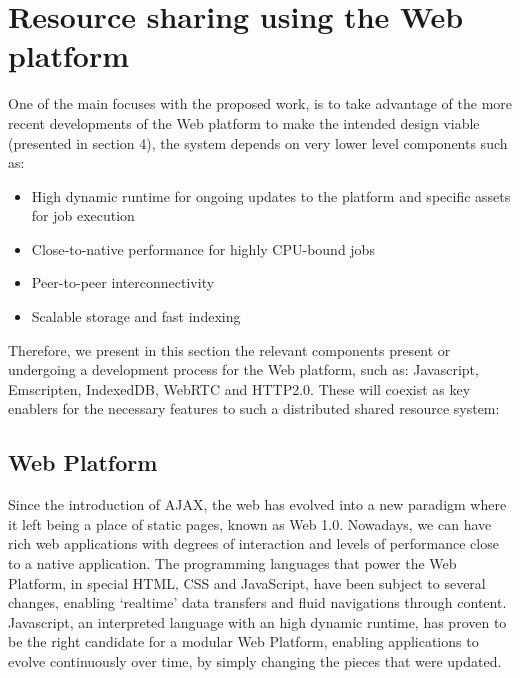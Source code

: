 \section{Resource sharing using the Web platform} 

One of the main focuses with the proposed work, is to take advantage of the more recent developments of the Web platform to make the intended design viable (presented in section 4), the system depends on very lower level components such as:
\begin{itemize}
  \item High dynamic runtime for ongoing updates to the platform and specific assets for job execution
  \item Close-to-native performance for highly CPU-bound jobs
  \item Peer-to-peer interconnectivity
  \item Scalable storage and fast indexing
\end{itemize}

Therefore, we present in this section the relevant components present or undergoing a development process for the Web platform, such as: Javascript, Emscripten, IndexedDB, WebRTC and HTTP2.0. These will coexist as key enablers for  the necessary features to such a distributed shared resource system:

\subsection{Web Platform}

Since the introduction of AJAX\cite{Google/Mozzila/Opera}, the web has evolved into a new paradigm where it left being a place of static pages, known as Web 1.0. Nowadays, we can have rich web applications with degrees of interaction and levels of performance close to a native application. The programming languages that power the Web Platform, in special HTML, CSS and JavaScript\cite{Ecma2009}, have been subject to several changes, enabling `realtime' data transfers and fluid navigations through content. Javascript, an interpreted language with an high dynamic runtime, has proven to be the right candidate for a modular Web Platform, enabling applications to evolve continuously over time, by simply changing the pieces that were updated.

